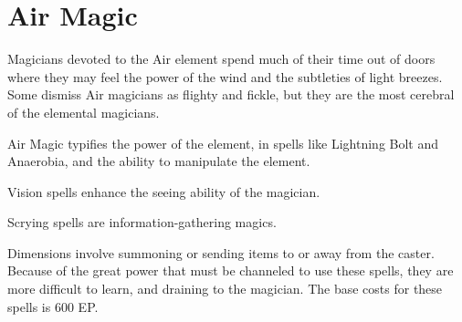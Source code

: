 \chapter{Air Magic}
\label{ch:elemental-air-magic}

Magicians devoted to the Air element spend much of their time out of doors where they may feel the power of the wind and the subtleties of light breezes. Some dismiss Air magicians as flighty and fickle, but they are the most cerebral of the elemental magicians.

Air Magic typifies the power of the element, in spells like Lightning Bolt and Anaerobia, and the ability to manipulate the element.

Vision spells enhance the seeing ability of the magician.

Scrying spells are information-gathering magics.

Dimensions involve summoning or sending items to or away from the caster. Because of the great power that must be channeled to use these spells, they are more difficult to learn, and draining to the magician. The base costs for these spells is 600 EP.

